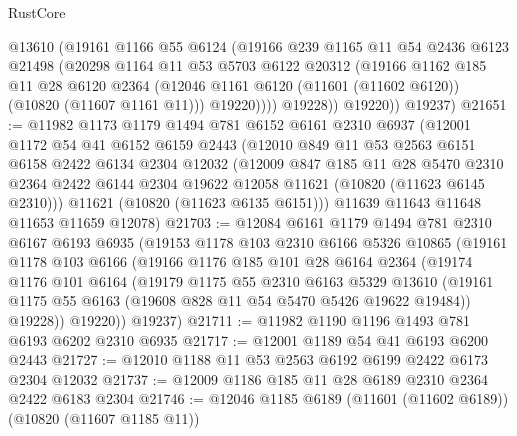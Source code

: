 \begin{lexlean}{RustCore}
\begin{coremodule}
              @13610
              (@19161
                @1166
                @55
                @6124
                (@19166
                  @239
                  @1165
                  @11
                  @54
                  @2436
                  @6123
                  @21498
                  (@20298
                    @1164
                    @11
                    @53
                    @5703
                    @6122
                    @20312
                    (@19166
                      @1162
                      @185
                      @11
                      @28
                      @6120
                      @2364
                      (@12046 @1161 @6120 (@11601 (@11602 @6120)) (@10820 (@11607 @1161 @11)))
                      @19220))))
              @19228))
          @19220))
      @19237)
@21651 := @11982
    @1173
    @1179
    @1494
    @781
    @6152
    @6161
    @2310
    @6937
    (@12001
      @1172
      @54
      @41
      @6152
      @6159
      @2443
      (@12010
        @849
        @11
        @53
        @2563
        @6151
        @6158
        @2422
        @6134
        @2304
        @12032
        (@12009
          @847
          @185
          @11
          @28
          @5470
          @2310
          @2364
          @2422
          @6144
          @2304
          @19622
          @12058
          @11621
          (@10820 (@11623 @6145 @2310)))
        @11621
        (@10820 (@11623 @6135 @6151)))
      @11639
      @11643
      @11648
      @11653
      @11659
      @12078)
@21703 := @12084
    @6161
    @1179
    @1494
    @781
    @2310
    @6167
    @6193
    @6935
    (@19153
      @1178
      @103
      @2310
      @6166
      @5326
      @10865
      (@19161
        @1178
        @103
        @6166
        (@19166
          @1176
          @185
          @101
          @28
          @6164
          @2364
          (@19174
            @1176
            @101
            @6164
            (@19179
              @1175
              @55
              @2310
              @6163
              @5329
              @13610
              (@19161 @1175 @55 @6163 (@19608 @828 @11 @54 @5470 @5426 @19622 @19484))
              @19228))
          @19220))
      @19237)
@21711 := @11982 @1190 @1196 @1493 @781 @6193 @6202 @2310 @6935
@21717 := @12001 @1189 @54 @41 @6193 @6200 @2443
@21727 := @12010 @1188 @11 @53 @2563 @6192 @6199 @2422 @6173 @2304 @12032
@21737 := @12009 @1186 @185 @11 @28 @6189 @2310 @2364 @2422 @6183 @2304
@21746 := @12046 @1185 @6189 (@11601 (@11602 @6189)) (@10820 (@11607 @1185 @11))

\end{coremodule}
\end{lexlean}
